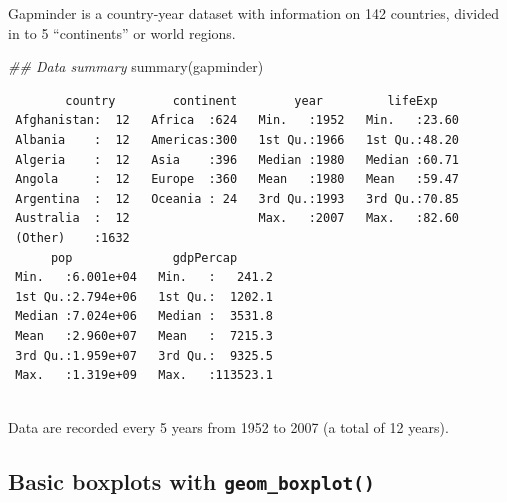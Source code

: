 \documentclass[
  letterpaper,
  DIV=11,
  numbers=noendperiod]{scrreprt}
\newenvironment{Shaded}{\begin{snugshade}}{\end{snugshade}}
\newcommand{\DocumentationTok}[1]{\textcolor[rgb]{0.37,0.37,0.37}{\textit{#1}}}
\newcommand{\FunctionTok}[1]{\textcolor[rgb]{0.28,0.35,0.67}{#1}}
\newcommand{\NormalTok}[1]{\textcolor[rgb]{0.00,0.23,0.31}{#1}}
\begin{document}
\begin{tcolorbox}[enhanced jigsaw, title=\textcolor{quarto-callout-note-color}{\faInfo}\hspace{0.5em}{Recap}, colbacktitle=quarto-callout-note-color!10!white, leftrule=.75mm, arc=.35mm, opacityback=0, bottomrule=.15mm, rightrule=.15mm, toptitle=1mm, breakable, toprule=.15mm, colback=white, coltitle=black, colframe=quarto-callout-note-color-frame, bottomtitle=1mm, titlerule=0mm, left=2mm, opacitybacktitle=0.6]

Gapminder is a country-year dataset with information on 142 countries,
divided in to 5 ``continents'' or world regions.

\begin{Shaded}
\begin{Highlighting}[]
\DocumentationTok{\#\# Data summary}
\FunctionTok{summary}\NormalTok{(gapminder)}
\end{Highlighting}
\end{Shaded}

\begin{verbatim}
        country        continent        year         lifeExp     
 Afghanistan:  12   Africa  :624   Min.   :1952   Min.   :23.60  
 Albania    :  12   Americas:300   1st Qu.:1966   1st Qu.:48.20  
 Algeria    :  12   Asia    :396   Median :1980   Median :60.71  
 Angola     :  12   Europe  :360   Mean   :1980   Mean   :59.47  
 Argentina  :  12   Oceania : 24   3rd Qu.:1993   3rd Qu.:70.85  
 Australia  :  12                  Max.   :2007   Max.   :82.60  
 (Other)    :1632                                                
      pop              gdpPercap       
 Min.   :6.001e+04   Min.   :   241.2  
 1st Qu.:2.794e+06   1st Qu.:  1202.1  
 Median :7.024e+06   Median :  3531.8  
 Mean   :2.960e+07   Mean   :  7215.3  
 3rd Qu.:1.959e+07   3rd Qu.:  9325.5  
 Max.   :1.319e+09   Max.   :113523.1  
                                       
\end{verbatim}

Data are recorded every 5 years from 1952 to 2007 (a total of 12 years).

\end{tcolorbox}

\subsection{\texorpdfstring{Basic boxplots with
\texttt{geom\_boxplot()}}{Basic boxplots with geom\_boxplot()}}\label{basic-boxplots-with-geom_boxplot}
\end{document}
